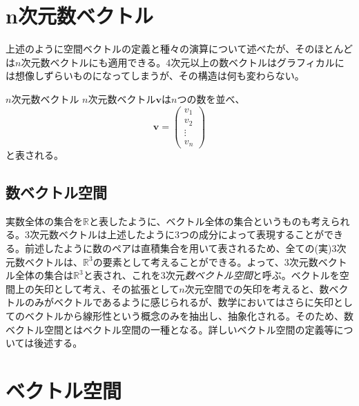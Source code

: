 \section{n次元数ベクトル}
上述のように空間ベクトルの定義と種々の演算について述べたが、そのほとんどは\(n\)次元数ベクトルにも適用できる。4次元以上の数ベクトルはグラフィカルには想像しずらいものになってしまうが、その構造は何も変わらない。
\begin{definition*}{\(n\)次元数ベクトル}
	\(n\)次元数ベクトル\(\boldsymbol{v}\)は\(n\)つの数を並べ、
	\begin{equation}
		\boldsymbol{v}=
		\begin{pmatrix} v_1 \\v_2 \\ \vdots\\ v_n \end{pmatrix}
	\end{equation}
	と表される。
\end{definition*}

\subsection{数ベクトル空間}
実数全体の集合を\(\mathbb{R}\)と表したように、ベクトル全体の集合というものも考えられる。3次元数ベクトルは上述したように3つの成分によって表現することができる。前述したように数のペアは直積集合を用いて表されるため、全ての(実)3次元数ベクトルは、\(\mathbb{R}^3\)の要素として考えることができる。よって、3次元数ベクトル全体の集合は\(\mathbb{R}^3\)と表され、これを3次元\emph{数ベクトル空間}と呼ぶ。ベクトルを空間上の矢印として考え、その拡張として\(n\)次元空間での矢印を考えると、数ベクトルのみがベクトルであるように感じられるが、数学においてはさらに矢印としてのベクトルから線形性という概念のみを抽出し、抽象化される。そのため、数ベクトル空間とはベクトル空間の一種となる。詳しいベクトル空間の定義等については後述する。

\section{ベクトル空間}
